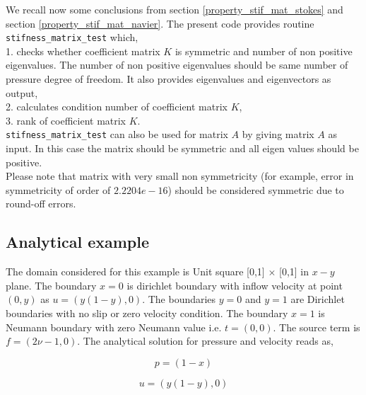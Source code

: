 \documentclass[a4paper]{book}
\begin{document}
We recall now some conclusions from section \ref{property_stif_mat_stokes} and section \ref{property_stif_mat_navier}. The present code provides routine \verb|stifness_matrix_test| which, \\

1. checks whether coefficient matrix $K$ is symmetric and number of non positive eigenvalues. The number of non positive eigenvalues should be same number of pressure degree of freedom. It also provides eigenvalues and eigenvectors as output,\\

2. calculates condition number of coefficient matrix $K$, \\

3. rank of coefficient matrix $K$.\\

\verb|stifness_matrix_test| can also be used for matrix $A$ by giving matrix $A$ as input. In this case the matrix should be symmetric and all eigen values should be positive.\\

Please note that matrix with very small non symmetricity (for example, error in symmetricity of order of $2.2204e-16$) should be considered symmetric due to round-off errors.

\subsection{Analytical example}

The domain considered for this example is Unit square [0,1] $\times$ [0,1] in $x-y$ plane. 
The boundary ${x=0}$ is dirichlet boundary with inflow velocity at point $(0,y)$ as $u = (y(1-y), 0)$. The boundaries ${y = 0}$ and ${y = 1}$ are Dirichlet boundaries with no slip or zero velocity condition. The boundary ${x = 1}$ is Neumann boundary with zero Neumann value i.e. $t = (0, 0)$. The source term is $f = (2 \nu - 1, 0)$. The analytical solution for pressure and velocity reads as,

\begin{center}

\begin{equation}
p = (1 - x)
\end{equation}

\begin{equation} 
 u = (y(1-y), 0)
\end{equation}

\end{center}
\end{document}
